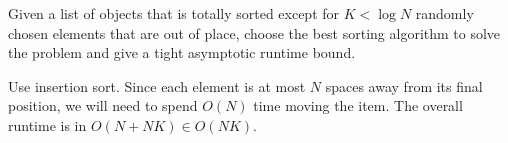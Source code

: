 \question Given a list of objects that is totally sorted except for
$K < \log N$ randomly chosen elements that are out of place, choose the best
sorting algorithm to solve the problem and give a tight asymptotic runtime
bound.

\begin{solution}[1in]
Use insertion sort. Since each element is at most $N$ spaces away from its
final position, we will need to spend $O(N)$ time moving the item.  The overall
runtime is in $O(N + NK) \in O(NK)$.
\end{solution}
